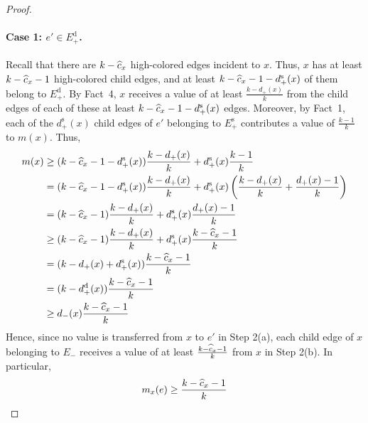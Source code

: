 \documentclass[smallextended]{svjour3}
\newcommand{\ed}{\ensuremath{E_{+}^{\text{d}}}\xspace}
\newcommand{\es}{\ensuremath{E_{+}^{\text{s}}}\xspace}
\def\dc{d_{+}}
\def\dd{d_{+}^{\text{d}}}
\def\dr{d_{-}}
\def\ds{d_{+}^{\text{s}}}
\begin{document}
\begin{proof}
\paragraph{Case 1: $e'\in \ed$.}
Recall that there are $k-\widehat{c}_x$ high-colored edges incident to $x$.
Thus, $x$ has at least $k-\widehat{c}_x-1$ high-colored child edges, and at
 least $k-\cmis-1-\ds(x)$ of them belong to $\ed$.
By Fact~4, $x$ receives a value of at least $\frac{k-\dc(x)}{k}$ from
 the child edges of each of these at least $k-\cmis-1-\ds(x)$ edges.
Moreover, by Fact~1, each of the $\ds(x)$ child edges of $e'$
 belonging to $\es$ contributes a value of $\frac{k-1}{k}$ to $m(x)$.
Thus, 
\begin{align*}
m(x)
& \geq (k-\cmis-1-\ds(x))\frac{k-\dc(x)}{k} + \ds(x)\frac{k-1}{k} \\
& =    (k-\cmis-1-\ds(x))\frac{k-\dc(x)}{k} +
       \ds(x) \left( \frac{k-\dc(x)}{k} + \frac{\dc(x)-1}{k} \right) \\
& =    (k-\cmis-1)\frac{k-\dc(x)}{k} + \ds(x)\frac{\dc(x)-1}{k} \\
& \geq (k-\cmis-1)\frac{k-\dc(x)}{k} + \ds(x)\frac{k-\cmis-1}{k} \\
& =    (k-\dc(x)+\ds(x))\frac{k-\cmis-1}{k}\\
& =    (k-\dd(x))\frac{k-\cmis-1}{k}\\
& \geq \dr(x)\frac{k-\cmis-1}{k}
\end{align*}
Hence, since no value is transferred from $x$ to $e'$ in Step 2(a), each child edge of $x$ belonging to $E_-$ receives a value of at least $\frac{k-\widehat{c}_x-1}{k}$ from $x$ in Step 2(b).
In particular, 
\begin{equation*}
m_x(e) \geq \frac{k-\widehat{c}_x-1}{k}
\end{equation*}


\end{proof}
\end{document}
